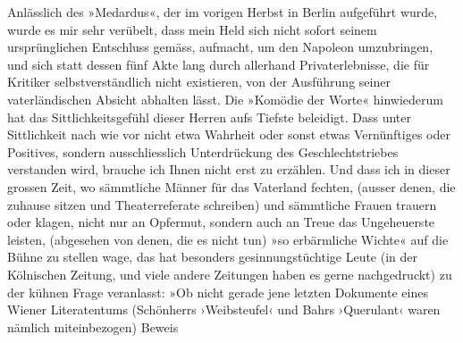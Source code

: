 \begin{ledgroupsized}[t]{13cm}
               Anlässlich des »Medardus«, der im vorigen Herbst in
                  Berlin aufgeführt wurde, wurde es mir sehr
               verübelt, dass mein Held sich nicht sofort seinem ursprünglichen Entschluss gemäss,
               aufmacht, um den Napoleon umzubringen, und sich
               statt dessen fünf Akte lang durch allerhand Privaterlebnisse, die für Kritiker
               selbstverständlich {\pb}nicht existieren, von der
               Ausführung seiner vaterländischen Absicht abhalten lässt. Die »Komödie der Worte« hinwiederum hat das Sittlichkeitsgefühl dieser
               Herren aufs Tiefste beleidigt. Dass unter Sittlichkeit nach wie vor nicht etwa
               Wahrheit oder sonst etwas Vernünftiges oder Positives, sondern ausschliesslich
               Unterdrückung des Geschlechtstrieb\introOben{}e\introOben{}s verstanden wird,
               brauche ich Ihnen nicht erst zu erzählen. Und dass ich in dieser grossen Zeit, wo
               sämmtliche Männer für das Vaterland fechten, (ausser denen, die zuhause sitzen und
               Theaterreferate schreiben) und sämmtliche Frauen trauern oder klagen, nicht nur an
               Opfermut, sondern auch an Treue das Ungeheuerste leisten, (abgesehen von denen, die
               es nicht tun) »so erbärmliche Wichte« auf die Bühne zu stellen wage, das hat
               besonders gesinnungstüchtige Leute (in der Kölnischen
                  Zeitung, und viele andere Zeitungen haben es gerne nachgedruckt) zu der
               kühnen Frage veranlasst: »Ob nicht
                  gerade jene letzten Dokumente eines Wiener
                  Literatentums (Schön{\pb}herrs ›Weibsteufel‹ und Bahrs ›Querulant‹ waren nämlich miteinbezogen) Beweis

\end{ledgroupsized}
